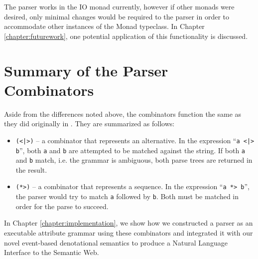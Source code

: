 \documentclass[../main.tex]{subfiles}
\begin{document}
The parser works in the IO monad currently, however if other monads were desired, only minimal changes would be required to the parser in order to accommodate
other instances of the Monad typeclass.  In Chapter \ref{chapter:futurework}, one potential application of this functionality is discussed.


\section{Summary of the Parser Combinators}

Aside from the differences noted above, the combinators function the same as they did originally in \cite{frosthafiz2008}.  They are summarized as follows:

\begin{itemize}
	\item \texttt{(<|>)} -- a combinator that represents an alternative.  In the expression ``\texttt{a <|> b}'', both \texttt{a} and \texttt{b} are attempted to be matched against the string.  If both \texttt{a} and \texttt{b} match, i.e. the grammar is ambiguous, both parse trees are returned in the result.
	\item \texttt{(*>)} -- a combinator that represents a sequence.  In the expression ``\texttt{a *> b}'', the parser would try to match \texttt{a} followed by \texttt{b}.  Both must be matched in order for the parse to succeed.
\end{itemize}

In Chapter \ref{chapter:implementation}, we show how we constructed a parser as an executable attribute grammar using these combinators and integrated it with our novel event-based denotational semantics to produce a Natural Language Interface to the Semantic Web.
\end{document}
